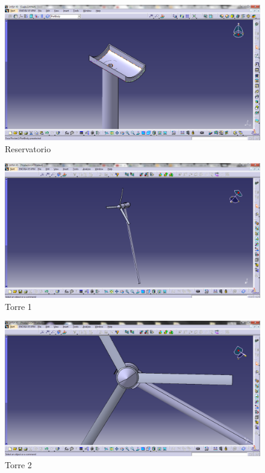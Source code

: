 \begin{figure}[!htbp]
	  \centering
	  \includegraphics[scale=0.45]{editaveis/figuras/C_Reservatorio}
	  \caption[Reservatorio]{Reservatorio}
	  \label{Reservatorio}
	\end{figure}
	\FloatBarrier
	
\begin{figure}[!htbp]
	  \centering
	  \includegraphics[scale=0.45]{editaveis/figuras/C_torre1}
	  \caption[Torre1]{Torre 1}
	  \label{Torre1}
	\end{figure}
	\FloatBarrier
	
\begin{figure}[!htbp]
	  \centering
	  \includegraphics[scale=0.45]{editaveis/figuras/C_torre2}
	  \caption[Torre2]{Torre 2}
	  \label{Torre2}
	\end{figure}
	\FloatBarrier
	
